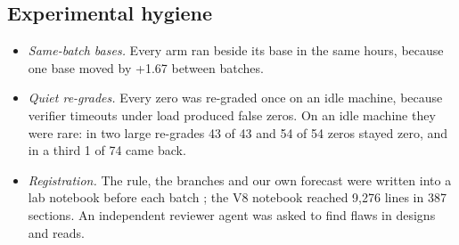\subsection{Experimental hygiene}

\begin{itemize}[leftmargin=1.4em]
  \item \emph{Same-batch bases.} Every arm ran beside its base in the same hours, because one base
    moved by +1.67 between batches.
  \item \emph{Quiet re-grades.} Every zero was re-graded once on an idle machine, because verifier
    timeouts under load produced false zeros. On an idle machine they were rare: in two large
    re-grades 43 of 43 and 54 of 54 zeros stayed zero, and in a third 1 of 74 came back.
  \item \emph{Registration.} The rule, the branches and our own forecast were written into a lab
    notebook before each batch \citep{nosek2018prereg}; the V8 notebook reached 9,276 lines in 387
    sections. An independent reviewer agent was asked to find flaws in designs and reads.
\end{itemize}
